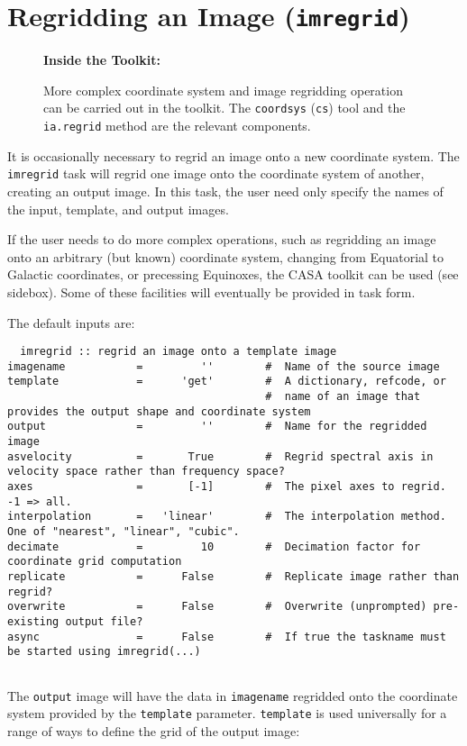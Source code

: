 \section{Regridding an Image ({\tt imregrid})}
\label{section:analysis.regrid}

\begin{wrapfigure}{r}{2.5in}
  \begin{boxedminipage}{2.5in}
     \centerline{\bf Inside the Toolkit:}
     More complex coordinate system and image regridding 
     operation can be carried out in the toolkit.  The 
     {\tt coordsys} ({\tt cs}) tool and the {\tt ia.regrid}
     method are the relevant components.
  \end{boxedminipage}
\end{wrapfigure}

It is occasionally necessary to regrid an image onto a new coordinate
system.  The {\tt imregrid} task will regrid one image onto the
coordinate system of another, creating an output image.  In this
task, the user need only specify the names of the input, template, and
output images.  

If the user needs to do more complex operations, such as regridding an
image onto an arbitrary (but known) coordinate system, changing from
Equatorial to Galactic coordinates, or precessing Equinoxes, the CASA
toolkit can be used (see sidebox).  Some of these facilities will
eventually be provided in task form.

The default inputs are:
\small
\begin{verbatim}
  imregrid :: regrid an image onto a template image
imagename           =         ''        #  Name of the source image
template            =      'get'        #  A dictionary, refcode, or
                                        #  name of an image that provides the output shape and coordinate system
output              =         ''        #  Name for the regridded image
asvelocity          =       True        #  Regrid spectral axis in velocity space rather than frequency space?
axes                =       [-1]        #  The pixel axes to regrid. -1 => all.
interpolation       =   'linear'        #  The interpolation method.  One of "nearest", "linear", "cubic".
decimate            =         10        #  Decimation factor for coordinate grid computation
replicate           =      False        #  Replicate image rather than regrid?
overwrite           =      False        #  Overwrite (unprompted) pre-existing output file?
async               =      False        #  If true the taskname must be started using imregrid(...)


\end{verbatim}
\normalsize
The {\tt output} image will have the data in {\tt imagename} regridded
onto the coordinate system provided by the {\tt template} parameter.
{\tt template} is used universally for a range of ways to define the
grid of the output image:

